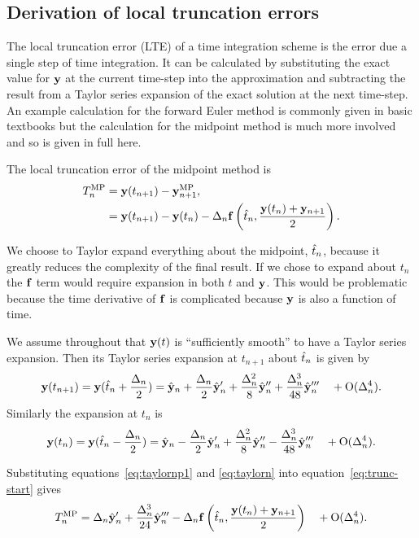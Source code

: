 \subsection{Derivation of local truncation errors}

The local truncation error (LTE) of a time integration scheme is the error due a single step of time integration.
It can be calculated by substituting the exact value for $\mathbf{y}$ at the current time-step into the approximation and subtracting the result from a Taylor series expansion of the exact solution at the next time-step.
An example calculation for the forward Euler method is commonly given in basic textbooks but the calculation for the midpoint method is much more involved and so is given in full here.

The local truncation error of the midpoint method is
\begin{align}
  T_n^{\text{MP}} &= \mathbf{y}(t_{n+1}) - \mathbf{y}_{n+1}^{\text{MP}}, \notag\\
  &= \mathbf{y}(t_{n+1}) - \mathbf{y}(t_n) - \Delta_{n} {\mathbf{f}}\left( \hat{t}_{n}, \frac{\mathbf{y}(t_n) + \mathbf{y}_{n+1}}{2} \right).
  \label{eq:trunc-start}
\end{align}

We choose to Taylor expand everything about the midpoint, $\hat{t}_{n}$, because it greatly reduces the complexity of the final result.
If we chose to expand about $t_n$ the ${\mathbf{f}}$ term would require expansion in both $t$ and $\mathbf{y}$.
This would be problematic because the time derivative of ${\mathbf{f}}$ is complicated because $\mathbf{y}$ is also a function of time.

We assume throughout that $\mathbf{y}(t)$ is ``sufficiently smooth'' to have a Taylor series expansion. Then its Taylor series expansion at $t_{n+1}$ about $\hat{t}_{n}$ is given by
\begin{equation}
  \mathbf{y}(t_{n+1}) = \mathbf{y}(\hat{t}_{n} + \frac{\Delta_{n}}{2}) = \hat{\mathbf{y}}_{n} + \frac{\Delta_{n}}{2} \hat{\mathbf{y}}_{n}' + \frac{\Delta_{n}^2}{8} \hat{\mathbf{y}}_{n}'' + \frac{\Delta_{n}^3}{48} \hat{\mathbf{y}}_{n}''' \quad + \text{O}(\Delta_{n}^4).
  \label{eq:taylornp1}
\end{equation}
Similarly the expansion at $t_n$ is
\begin{equation}
  \mathbf{y}(t_n) = \mathbf{y}(\hat{t}_{n} - \frac{\Delta_{n}}{2}) = \hat{\mathbf{y}}_{n} - \frac{\Delta_{n}}{2} \hat{\mathbf{y}}_{n}' + \frac{\Delta_{n}^2}{8} \hat{\mathbf{y}}_{n}'' - \frac{\Delta_{n}^3}{48} \hat{\mathbf{y}}_{n}''' \quad + \text{O}(\Delta_{n}^4).
  \label{eq:taylorn}
\end{equation}

Substituting equations~\eqref{eq:taylornp1} and \eqref{eq:taylorn} into equation~\eqref{eq:trunc-start} gives
\begin{equation}
  T_n^{\text{MP}} = \Delta_{n} \hat{\mathbf{y}}_{n}' + \frac{\Delta_{n}^3}{24} \hat{\mathbf{y}}_{n}'''
  - \Delta_{n} {\mathbf{f}}\left( \hat{t}_{n}, \frac{\mathbf{y}(t_n) + \mathbf{y}_{n+1}}{2} \right)  \quad + \text{O}(\Delta_{n}^4).
  \label{eq:trunc-mid}
\end{equation}

